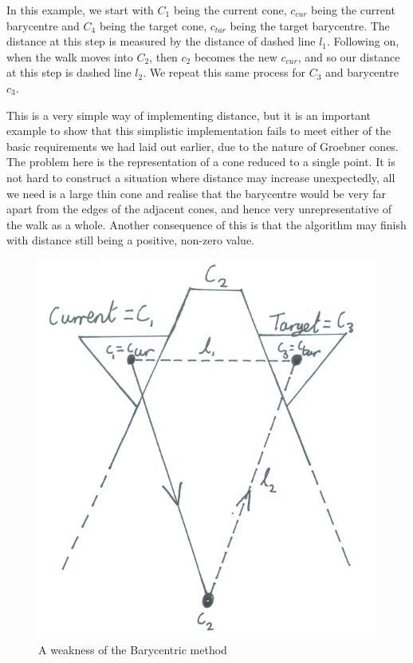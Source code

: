 \documentclass[12pt,a4paper]{report}
\begin{document}
In this example, we start with $C_{1}$ being the current cone, $c_{cur}$ being the current barycentre and $C_{4}$ being the target cone, $c_{tar}$ being the target barycentre. The distance at this step is measured by the distance of dashed line $l_{1}$. Following on, when the walk moves into $C_{2}$, then $c_{2}$ becomes the new $c_{cur}$, and so our distance at this step is dashed line $l_{2}$. We repeat this same process for $C_{3}$ and barycentre $c_{3}$.

This is a very simple way of implementing distance, but it is an important example to show that this simplistic implementation fails to meet either of the basic requirements we had laid out earlier, due to the nature of Groebner cones. The problem here is the representation of a cone reduced to a single point. It is not hard to construct a situation where distance may increase unexpectedly, all we need is a large thin cone and realise that the barycentre would be very far apart from the edges of the adjacent cones, and hence very unrepresentative of the walk as a whole. Another consequence of this is that the algorithm may finish with distance still being a positive, non-zero value.

\begin{figure}
\includegraphics[scale=0.5]{Chapters/images/Barycentre2.png}
\caption{A weakness of the Barycentric method}
\end{figure}
\end{document}
